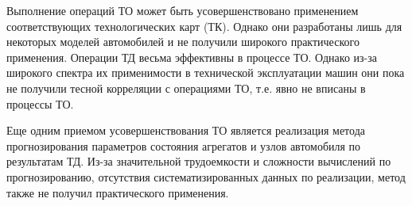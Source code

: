 Выполнение операций ТО может быть усовершенствовано применением соответствующих
технологических карт (ТК). Однако они разработаны лишь для некоторых моделей
автомобилей и не получили широкого практического применения.
Операции ТД весьма эффективны в процессе ТО. Однако из-за широкого спектра их
применимости в технической эксплуатации машин они пока не получили тесной
корреляции с операциями ТО, т.е. явно не вписаны в процессы ТО.

Еще одним приемом усовершенствования ТО является реализация метода
прогнозирования параметров состояния агрегатов и узлов автомобиля по результатам
ТД. Из-за значительной трудоемкости и сложности вычислений по прогнозированию,
отсутствия систематизированных данных по реализации, метод также не получил
практического применения.
